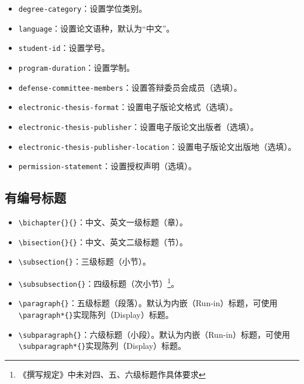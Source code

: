 \begin{itemize}
    \item \texttt{degree-category}：设置学位类别。
    \item \texttt{language}：设置论文语种，默认为“中文”。
    \item \texttt{student-id}：设置学号。
    \item \texttt{program-duration}：设置学制。
    \item \texttt{defense-committee-members}：设置答辩委员会成员（选填）。
    \item \texttt{electronic-thesis-format}：设置电子版论文格式（选填）。
    \item \texttt{electronic-thesis-publisher}：设置电子版论文出版者（选填）。
    \item \texttt{electronic-thesis-publisher-location}：设置电子版论文出版地（选填）。
    \item \texttt{permission-statement}：设置授权声明（选填）。
\end{itemize}

\subsection{有编号标题}
\begin{itemize}[itemsep=2pt,topsep=5pt]
    \item \verb|\bichapter{}{}|：中文、英文一级标题（章）。
    \item \verb|\bisection{}{}|：中文、英文二级标题（节）。
    \item \verb|\subsection{}|：三级标题（小节）。
    \item \verb|\subsubsection{}|：四级标题（次小节）\footnote{《撰写规定》中未对四、五、六级标题作具体要求}。
    \item \verb|\paragraph{}|：五级标题（段落）。默认为内嵌（Run-in）标题，可使用\verb|\paragraph*{}|实现陈列（Display）标题。
    \item \verb|\subparagraph{}|：六级标题（小段）。默认为内嵌（Run-in）标题，可使用\verb|\subparagraph*{}|实现陈列（Display）标题。
\end{itemize}

